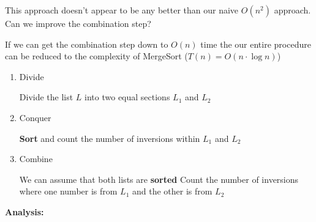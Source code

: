 \documentclass{article}
\begin{document}
This approach doesn't appear to be any better than our naive $O(n^{2})$ approach. Can we improve the combination step?

If we can get the combination step down to $O(n)$ time the our entire procedure can be reduced to the complexity of MergeSort ($T(n) = O(n\cdot \log n)$)


\begin{enumerate}
  \item Divide

        Divide the list $L$ into two equal sections $L_{1}$ and $L_{2}$


  \item Conquer

        \textbf{Sort } and count the number of inversions within $L_{1}$ and $L_{2}$


  \item Combine

        We can assume that both lists are \textbf{sorted}
        Count the number of inversions where one number is from $L_{1}$ and the other is from $L_{2}$
\end{enumerate}

\textbf{Analysis:}
\end{document}
